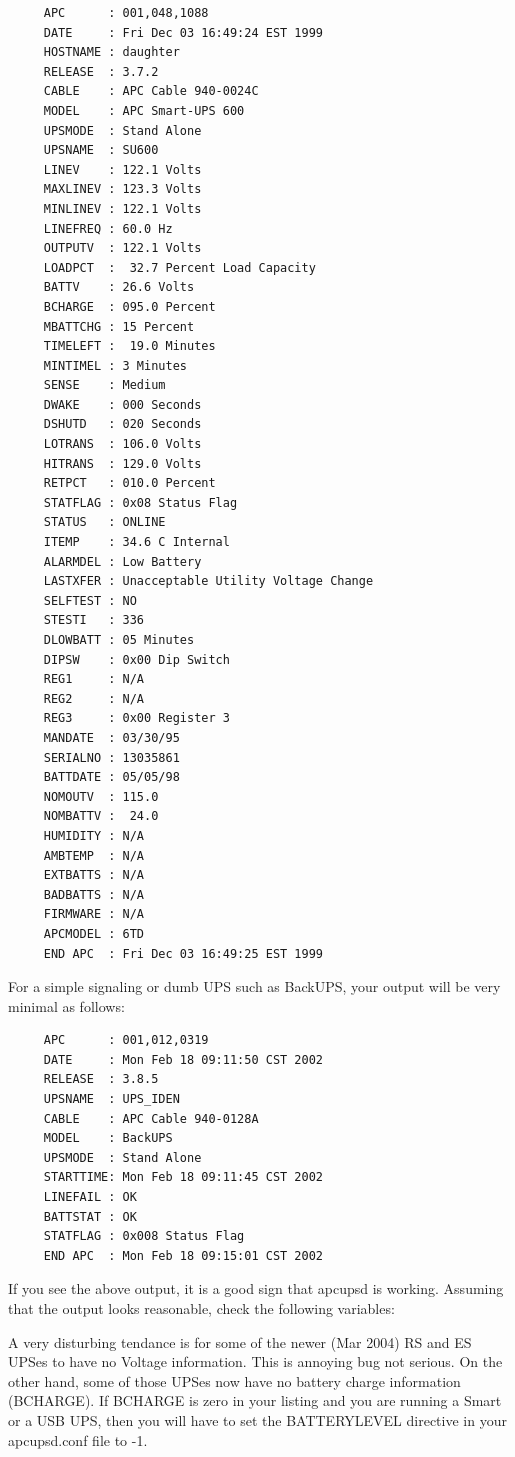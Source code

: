 \footnotesize
\begin{verbatim}
     APC      : 001,048,1088
     DATE     : Fri Dec 03 16:49:24 EST 1999
     HOSTNAME : daughter
     RELEASE  : 3.7.2
     CABLE    : APC Cable 940-0024C
     MODEL    : APC Smart-UPS 600
     UPSMODE  : Stand Alone
     UPSNAME  : SU600
     LINEV    : 122.1 Volts
     MAXLINEV : 123.3 Volts
     MINLINEV : 122.1 Volts
     LINEFREQ : 60.0 Hz
     OUTPUTV  : 122.1 Volts
     LOADPCT  :  32.7 Percent Load Capacity
     BATTV    : 26.6 Volts
     BCHARGE  : 095.0 Percent
     MBATTCHG : 15 Percent
     TIMELEFT :  19.0 Minutes
     MINTIMEL : 3 Minutes
     SENSE    : Medium
     DWAKE    : 000 Seconds
     DSHUTD   : 020 Seconds
     LOTRANS  : 106.0 Volts
     HITRANS  : 129.0 Volts
     RETPCT   : 010.0 Percent
     STATFLAG : 0x08 Status Flag
     STATUS   : ONLINE
     ITEMP    : 34.6 C Internal
     ALARMDEL : Low Battery
     LASTXFER : Unacceptable Utility Voltage Change
     SELFTEST : NO
     STESTI   : 336
     DLOWBATT : 05 Minutes
     DIPSW    : 0x00 Dip Switch
     REG1     : N/A
     REG2     : N/A
     REG3     : 0x00 Register 3
     MANDATE  : 03/30/95
     SERIALNO : 13035861
     BATTDATE : 05/05/98
     NOMOUTV  : 115.0
     NOMBATTV :  24.0
     HUMIDITY : N/A
     AMBTEMP  : N/A
     EXTBATTS : N/A
     BADBATTS : N/A
     FIRMWARE : N/A
     APCMODEL : 6TD
     END APC  : Fri Dec 03 16:49:25 EST 1999
\end{verbatim}
\normalsize

For a simple signaling or dumb UPS such as BackUPS, your output will be very
minimal as follows: 

\footnotesize
\begin{verbatim}
     APC      : 001,012,0319
     DATE     : Mon Feb 18 09:11:50 CST 2002
     RELEASE  : 3.8.5
     UPSNAME  : UPS_IDEN
     CABLE    : APC Cable 940-0128A
     MODEL    : BackUPS
     UPSMODE  : Stand Alone
     STARTTIME: Mon Feb 18 09:11:45 CST 2002
     LINEFAIL : OK
     BATTSTAT : OK
     STATFLAG : 0x008 Status Flag
     END APC  : Mon Feb 18 09:15:01 CST 2002
\end{verbatim}
\normalsize

If you see the above output, it is a good sign that apcupsd is working.
Assuming that the output looks reasonable, check the following variables:  

A very disturbing tendance is for some of the newer (Mar 2004) RS and ES UPSes
to have no Voltage information.  This is annoying bug not serious.  On the
other hand, some of those UPSes now have no battery charge information
(BCHARGE).  If BCHARGE is zero in your listing and you are running a Smart or
a USB UPS, then you will have to set the BATTERYLEVEL directive in your
apcupsd.conf file to -1.  

